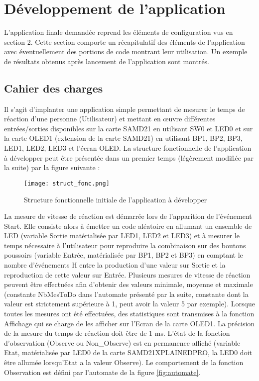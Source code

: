 \section{Développement de l'application}

\indent L'application finale demandée reprend les éléments de configuration vus en section 2.
Cette section comporte un récapitulatif des éléments de l'application avec éventuellement des portions de code montrant leur utilisation.
Un exemple de résultats obtenus après lancement de l'application sont montrés.

\subsection{Cahier des charges}

\indent Il s'agit d'implanter une application simple permettant de mesurer le temps de réaction d'une personne (Utilisateur) et mettant en œuvre différentes entrées/sorties disponibles sur la carte SAMD21 en utilisant SW0 et LED0 et sur la carte OLED1 (extension de la carte SAMD21) en utilisant BP1, BP2, BP3, LED1, LED2, LED3 et l'écran OLED.
La structure fonctionnelle de l'application à développer peut être présentée dans un premier temps (légèrement modifiée par la suite) par la figure suivante :

\begin{figure}[h]
    \centering
    \texttt{[image: struct\_fonc.png]}
    \caption{Structure fonctionnelle initiale de l'application à développer}
    \label{fig:struct}
\end{figure}

\indent La mesure de vitesse de réaction est démarrée lors de l'apparition de l'événement Start.
Elle consiste alors à émettre un code aléatoire en allumant un ensemble de LED (variable Sortie matérialisée par LED1, LED2 et LED3) et à mesurer le temps nécessaire à l'utilisateur pour reproduire la combinaison sur des boutons poussoirs (variable Entrée, matérialisée par BP1, BP2 et BP3) en comptant le nombre d'événements H entre la production d'une valeur sur Sortie et la reproduction de cette valeur sur Entrée. 
Plusieurs mesures de vitesse de réaction peuvent être effectuées afin d'obtenir des valeurs minimale, moyenne et maximale (constante NbMesToDo dans l'automate présenté par la suite, constante dont la valeur est strictement supérieure à 1, peut avoir la valeur 5 par exemple).
Lorsque toutes les mesures ont été effectuées, des statistiques sont transmises à la fonction Affichage qui se charge de les afficher sur l'Ecran de la carte OLED1.
La précision de la mesure du temps de réaction doit être de 1 ms.
L'état de la fonction d'observation (Observe ou Non\_Observe) est en permanence affiché (variable Etat, matérialisée par LED0 de la carte SAMD21XPLAINEDPRO, la LED0 doit être allumée lorsqu'Etat a la valeur Observe).
Le comportement de la fonction Observation est défini par l'automate de la figure \ref{fig:automate}.


